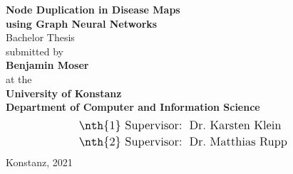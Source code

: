 \documentclass[
	fontsize=10pt, %
	twoside=true, %
	secnumdepth=1, %
  toc=indentunnumbered %
]{kaobook}
\begin{document}
\begin{titlepage}
  \begin{center}
    {\LARGE \textbf{Node Duplication in Disease Maps \\[0.7em] using Graph Neural Networks}}
    \\[2em]
    {\Large {Bachelor Thesis}}
    \\[5.5em]
    {\Large submitted by}
    \\[1.5em]
    {\LARGE \textbf{Benjamin Moser}}
    \\[1.5em]
    {\Large at the}
    \\[1.2em]
    {\Large \textbf{University of Konstanz}}
    \\[1.0em]
    {\Large \textbf{Department of Computer and Information Science}}
    \\[4em]
    \begin{align*}
      \text{\large {\nth{1} Supervisor}:~} &  \text{ \large Dr.\ Karsten Klein } \\
      \text{\large {\nth{2} Supervisor}:~} &  \text{ \large Dr.\ Matthias Rupp } \\
    \end{align*}
    \vfill
    {\Large {Konstanz, 2021}}
  \end{center}
\end{titlepage}











\frontmatter %


\end{document}
